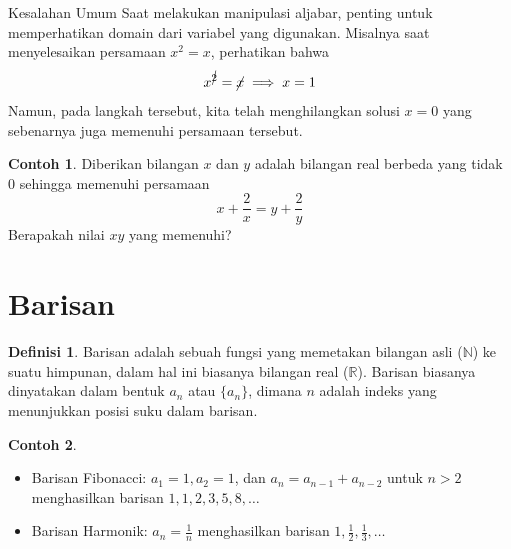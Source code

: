 \documentclass[aspectratio=169]{beamer}
\theoremstyle{definition}
\newtheorem{definisi}{Definisi}
\newtheorem{contoh}{Contoh}
\begin{document}
\begin{frame}{\insertsection}{\insertsubsection}
  \begin{alertblock}{Kesalahan Umum}
    Saat melakukan manipulasi aljabar, penting untuk memperhatikan domain dari variabel yang digunakan. Misalnya saat menyelesaikan persamaan $x^2=x$, perhatikan bahwa
    \[
      x^{\cancel{2}}=\cancel{x}\implies x=1
    \]
    Namun, pada langkah tersebut, kita telah menghilangkan solusi $x=0$ yang sebenarnya juga memenuhi persamaan tersebut.
  \end{alertblock}
\end{frame}

\begin{frame}{\insertsection}{\insertsubsection}
  \begin{contoh}
    Diberikan bilangan $x$ dan $y$ adalah bilangan real berbeda yang tidak 0 sehingga memenuhi persamaan
    $$x + \frac{2}{x} = y + \frac{2}{y}$$
    Berapakah nilai $xy$ yang memenuhi?

  \end{contoh}
\end{frame}

\section{Barisan}
\begin{frame}{\insertsection}
  \begin{definisi}
    Barisan adalah sebuah fungsi yang memetakan bilangan asli ($\mathbb{N}$) ke suatu himpunan, dalam hal ini biasanya bilangan real ($\mathbb{R}$). Barisan biasanya dinyatakan dalam bentuk $a_n$ atau $\{a_n\}$, dimana $n$ adalah indeks yang menunjukkan posisi suku dalam barisan.
  \end{definisi}
  \begin{contoh}
    \begin{itemize}
      \item Barisan Fibonacci: $a_1 = 1, a_2 = 1$, dan $a_n = a_{n-1} + a_{n-2}$ untuk $n > 2$ menghasilkan barisan $1, 1, 2, 3, 5, 8, \ldots$
      \item Barisan Harmonik: $a_n = \frac{1}{n}$ menghasilkan barisan $1, \frac{1}{2}, \frac{1}{3}, \ldots$
    \end{itemize}
  \end{contoh}
\end{frame}
\end{document}
